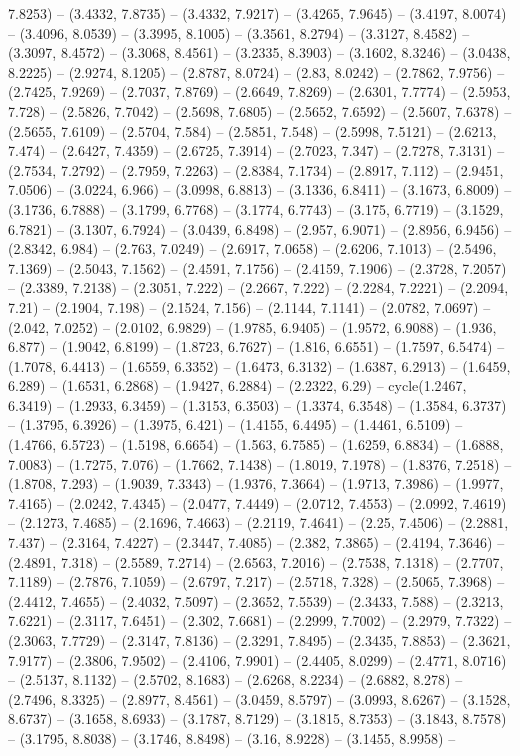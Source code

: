 7.8253) -- (3.4332, 7.8735) -- (3.4332, 7.9217) -- (3.4265, 7.9645) -- (3.4197, 8.0074) -- (3.4096, 8.0539) -- (3.3995, 8.1005) -- (3.3561, 8.2794) -- (3.3127, 8.4582) -- (3.3097, 8.4572) -- (3.3068, 8.4561) -- (3.2335, 8.3903) -- (3.1602, 8.3246) -- (3.0438, 8.2225) -- (2.9274, 8.1205) -- (2.8787, 8.0724) -- (2.83, 8.0242) -- (2.7862, 7.9756) -- (2.7425, 7.9269) -- (2.7037, 7.8769) -- (2.6649, 7.8269) -- (2.6301, 7.7774) -- (2.5953, 7.728) -- (2.5826, 7.7042) -- (2.5698, 7.6805) -- (2.5652, 7.6592) -- (2.5607, 7.6378) -- (2.5655, 7.6109) -- (2.5704, 7.584) -- (2.5851, 7.548) -- (2.5998, 7.5121) -- (2.6213, 7.474) -- (2.6427, 7.4359) -- (2.6725, 7.3914) -- (2.7023, 7.347) -- (2.7278, 7.3131) -- (2.7534, 7.2792) -- (2.7959, 7.2263) -- (2.8384, 7.1734) -- (2.8917, 7.112) -- (2.9451, 7.0506) -- (3.0224, 6.966) -- (3.0998, 6.8813) -- (3.1336, 6.8411) -- (3.1673, 6.8009) -- (3.1736, 6.7888) -- (3.1799, 6.7768) -- (3.1774, 6.7743) -- (3.175, 6.7719) -- (3.1529, 6.7821) -- (3.1307, 6.7924) -- (3.0439, 6.8498) -- (2.957, 6.9071) -- (2.8956, 6.9456) -- (2.8342, 6.984) -- (2.763, 7.0249) -- (2.6917, 7.0658) -- (2.6206, 7.1013) -- (2.5496, 7.1369) -- (2.5043, 7.1562) -- (2.4591, 7.1756) -- (2.4159, 7.1906) -- (2.3728, 7.2057) -- (2.3389, 7.2138) -- (2.3051, 7.222) -- (2.2667, 7.222) -- (2.2284, 7.2221) -- (2.2094, 7.21) -- (2.1904, 7.198) -- (2.1524, 7.156) -- (2.1144, 7.1141) -- (2.0782, 7.0697) -- (2.042, 7.0252) -- (2.0102, 6.9829) -- (1.9785, 6.9405) -- (1.9572, 6.9088) -- (1.936, 6.877) -- (1.9042, 6.8199) -- (1.8723, 6.7627) -- (1.816, 6.6551) -- (1.7597, 6.5474) -- (1.7078, 6.4413) -- (1.6559, 6.3352) -- (1.6473, 6.3132) -- (1.6387, 6.2913) -- (1.6459, 6.289) -- (1.6531, 6.2868) -- (1.9427, 6.2884) -- (2.2322, 6.29) -- cycle(1.2467, 6.3419) -- (1.2933, 6.3459) -- (1.3153, 6.3503) -- (1.3374, 6.3548) -- (1.3584, 6.3737) -- (1.3795, 6.3926) -- (1.3975, 6.421) -- (1.4155, 6.4495) -- (1.4461, 6.5109) -- (1.4766, 6.5723) -- (1.5198, 6.6654) -- (1.563, 6.7585) -- (1.6259, 6.8834) -- (1.6888, 7.0083) -- (1.7275, 7.076) -- (1.7662, 7.1438) -- (1.8019, 7.1978) -- (1.8376, 7.2518) -- (1.8708, 7.293) -- (1.9039, 7.3343) -- (1.9376, 7.3664) -- (1.9713, 7.3986) -- (1.9977, 7.4165) -- (2.0242, 7.4345) -- (2.0477, 7.4449) -- (2.0712, 7.4553) -- (2.0992, 7.4619) -- (2.1273, 7.4685) -- (2.1696, 7.4663) -- (2.2119, 7.4641) -- (2.25, 7.4506) -- (2.2881, 7.437) -- (2.3164, 7.4227) -- (2.3447, 7.4085) -- (2.382, 7.3865) -- (2.4194, 7.3646) -- (2.4891, 7.318) -- (2.5589, 7.2714) -- (2.6563, 7.2016) -- (2.7538, 7.1318) -- (2.7707, 7.1189) -- (2.7876, 7.1059) -- (2.6797, 7.217) -- (2.5718, 7.328) -- (2.5065, 7.3968) -- (2.4412, 7.4655) -- (2.4032, 7.5097) -- (2.3652, 7.5539) -- (2.3433, 7.588) -- (2.3213, 7.6221) -- (2.3117, 7.6451) -- (2.302, 7.6681) -- (2.2999, 7.7002) -- (2.2979, 7.7322) -- (2.3063, 7.7729) -- (2.3147, 7.8136) -- (2.3291, 7.8495) -- (2.3435, 7.8853) -- (2.3621, 7.9177) -- (2.3806, 7.9502) -- (2.4106, 7.9901) -- (2.4405, 8.0299) -- (2.4771, 8.0716) -- (2.5137, 8.1132) -- (2.5702, 8.1683) -- (2.6268, 8.2234) -- (2.6882, 8.278) -- (2.7496, 8.3325) -- (2.8977, 8.4561) -- (3.0459, 8.5797) -- (3.0993, 8.6267) -- (3.1528, 8.6737) -- (3.1658, 8.6933) -- (3.1787, 8.7129) -- (3.1815, 8.7353) -- (3.1843, 8.7578) -- (3.1795, 8.8038) -- (3.1746, 8.8498) -- (3.16, 8.9228) -- (3.1455, 8.9958) -- 